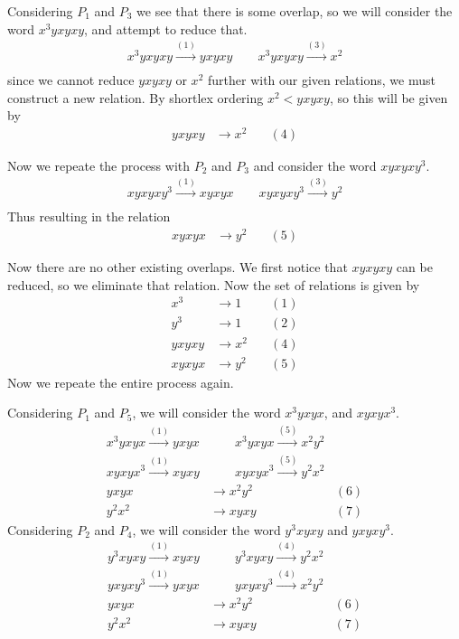 \documentclass[10pt]{amsart}
\theoremstyle{definition}
\begin{document}
Considering $P_1$ and $P_3$ we see that there is some overlap, so we will
consider the word $x^3yxyxy$, and attempt to reduce that.
\begin{align*}
  x^3yxyxy\xrightarrow{(1)}yxyxy\quad\quad
  x^3yxyxy\xrightarrow{(3)}x^2\\
\end{align*}
since we cannot reduce $yxyxy$ or $x^2$ further with our given relations, we
must construct a new relation. By shortlex ordering $x^2<yxyxy$, so this will
be given by
\begin{align*}
  yxyxy&\rightarrow x^2\quad&(4)
\end{align*}

Now we repeate the process with $P_2$ and $P_3$ and consider the word
$xyxyxy^3$.
\begin{align*}
  xyxyxy^3\xrightarrow{(1)}xyxyx\quad\quad
  xyxyxy^3\xrightarrow{(3)}y^2\\
\end{align*}
Thus resulting in the relation
\begin{align*}
  xyxyx&\rightarrow y^2\quad&(5)
\end{align*}

Now there are no other existing overlaps. We first notice that $xyxyxy$ can be
reduced, so we eliminate that relation. Now the set of relations is given by
\begin{align*}
  x^3&\rightarrow1\quad&(1)\\
  y^3&\rightarrow1\quad&(2)\\
  yxyxy&\rightarrow x^2\quad&(4)\\
  xyxyx&\rightarrow y^2\quad&(5)
\end{align*}
Now we repeate the entire process again.

Considering $P_1$ and $P_5$, we will consider the word $x^3yxyx$, and $xyxyx^3$.
\begin{align*}
  x^3yxyx\xrightarrow{(1)}yxyx&\quad\quad
  x^3yxyx\xrightarrow{(5)}x^2y^2\\
  xyxyx^3\xrightarrow{(1)}xyxy&\quad\quad
  xyxyx^3\xrightarrow{(5)}y^2x^2\\
  yxyx&\rightarrow x^2y^2\quad&(6)\\
  y^2x^2&\rightarrow xyxy\quad&(7)
\end{align*}
Considering $P_2$ and $P_4$, we will consider the word $y^3xyxy$ and $yxyxy^3$.
\begin{align*}
  y^3xyxy\xrightarrow{(1)}xyxy&\quad\quad
  y^3xyxy\xrightarrow{(4)}y^2x^2\\
  yxyxy^3\xrightarrow{(1)}yxyx&\quad\quad
  yxyxy^3\xrightarrow{(4)}x^2y^2\\
  yxyx&\rightarrow x^2y^2\quad&(6)\\
  y^2x^2&\rightarrow xyxy\quad&(7)
\end{align*}
\end{document}
